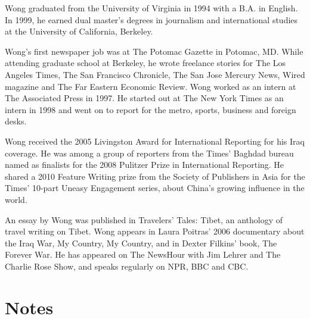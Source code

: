 Wong graduated from the University of Virginia in 1994 with a B.A. in
English. In 1999, he earned dual master's degrees in journalism and
international studies at the University of California, Berkeley.

Wong's first newspaper job was at The Potomac Gazette in Potomac, MD.
While attending graduate school at Berkeley, he wrote freelance stories
for The Los Angeles Times, The San Francisco Chronicle, The San Jose
Mercury News, Wired magazine and The Far Eastern Economic Review. Wong
worked as an intern at The Associated Press in 1997. He started out at
The New York Times as an intern in 1998 and went on to report for the
metro, sports, business and foreign desks.

Wong received the 2005 Livingston Award for International Reporting for
his Iraq coverage. He was among a group of reporters from the Times'
Baghdad bureau named as finalists for the 2008 Pulitzer Prize in
International Reporting. He shared a 2010 Feature Writing prize from the
Society of Publishers in Asia for the Times' 10-part Uneasy Engagement
series, about China's growing influence in the world.

An essay by Wong was published in Travelers' Tales: Tibet, an anthology
of travel writing on Tibet. Wong appears in Laura Poitras' 2006
documentary about the Iraq War, My Country, My Country, and in Dexter
Filkins' book, The Forever War. He has appeared on The NewsHour with Jim
Lehrer and The Charlie Rose Show, and speaks regularly on NPR, BBC and
CBC.

\section{Notes}\label{notes}
